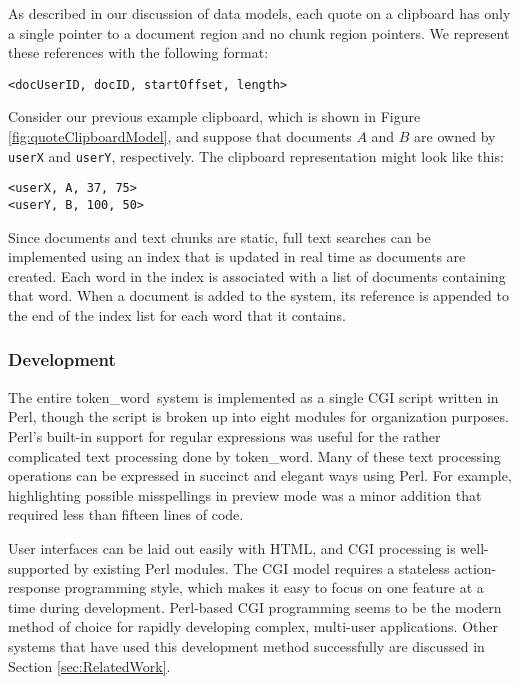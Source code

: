\documentclass{acm_proc_article-sp}
\newcommand{\tokenWord}{token\_word}
\begin{document}
As described in our discussion of data models, each quote on a clipboard has only a single pointer to a document region and no chunk region pointers.
We represent these references with the following format:
\begin{center}
\texttt{<docUserID, docID, startOffset, length>} 
\end{center}
Consider our previous example clipboard, which is shown in Figure \ref{fig:quoteClipboardModel}, and suppose that documents $A$ and  $B$ are owned by \texttt{userX} and \texttt{userY}, respectively.
The clipboard representation might look like this:
\begin{center}
\texttt{<userX, A, 37, 75>}\\
\texttt{<userY, B, 100, 50>}\\ 
\end{center}




Since documents and text chunks are static, full text searches can be implemented using an index that is updated in real time as documents are created.
Each word in the index is associated with a list of documents containing that word.
When a document is added to the system, its reference is appended to the end of the index list for each word that it contains.


\subsubsection{Development}
The entire \tokenWord \   system is implemented as a single CGI script written in Perl, though the script is broken up into eight modules for organization purposes.
Perl's built-in support for regular expressions was useful for the rather complicated text processing done by \tokenWord.
Many of these text processing operations can be expressed in succinct and elegant ways using Perl.
For example, highlighting possible misspellings in preview mode was a minor addition that required less than fifteen lines of code.

User interfaces can be laid out easily with HTML, and CGI processing is well-supported by existing Perl modules.
The CGI model requires a stateless action-response programming style, which makes it easy to focus on one feature at a time during development.
Perl-based CGI programming seems to be the modern method of choice for rapidly developing complex, multi-user applications.
Other systems that have used this development method successfully are discussed in Section \ref{sec:RelatedWork}.
\end{document}
